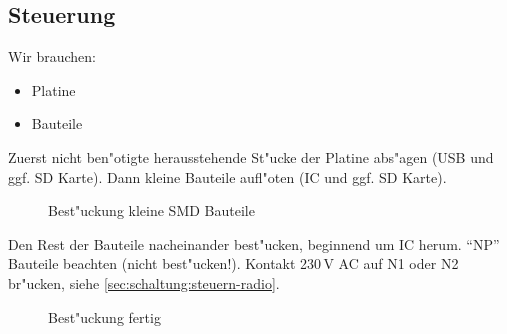 \documentclass[ngerman,11pt,parskip=half] {scrartcl}
\begin{document}
\subsection{Steuerung} \label{sec:aufbau:steuerung}

Wir brauchen:
\begin{itemize}
\item Platine
\item Bauteile
\end{itemize}

Zuerst nicht ben"otigte herausstehende St"ucke der Platine abs"agen (USB und ggf. SD Karte). Dann kleine Bauteile aufl"oten (IC und ggf. SD Karte).

\begin{figure}[H]
\centering
{}
\caption{Best"uckung kleine SMD Bauteile} \label{fig:1}
\end{figure}

Den Rest der Bauteile nacheinander best"ucken, beginnend um IC herum. "`NP"' Bauteile beachten (nicht best"ucken!). Kontakt 230\,V AC auf N1 oder N2 br"ucken, siehe \ref{sec:schaltung:steuern-radio}.

\begin{figure}[H]
\centering
{}
\caption{Best"uckung fertig} \label{fig:1}
\end{figure}
\end{document}
